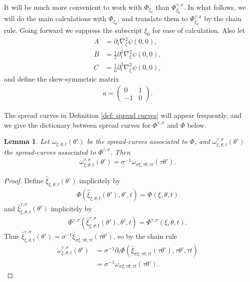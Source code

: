 \documentclass[12pt]{amsart}
\numberwithin{equation}{section}
\newtheorem{lemma}{Lemma}[section]
\newcommand{\1}{\mathbbm{1}}
\begin{document}
It will be much more convenient to work with $\Phi_{\xi_0}$ than $\Phi_{\xi_0}^{\tau, \sigma}$. In what follows, we will do the main calculations with $\Phi_{\xi_0}$, and translate them to $\Phi^{\tau, \sigma}_{\xi_0}$ by the chain rule. Going forward we suppress the subscript $\xi_0$ for ease of calculation. Also let 
\begin{align}
    A &= \partial_t \nabla_\xi^2 \psi(0,0), \\
    B &= \tfrac{1}{2} \partial_t^2 \nabla_\xi^2 \psi(0,0), \\
    C &= \tfrac{1}{6} \partial_t^3 \nabla_\xi^2 \psi(0,0),
\end{align}
and define the skew-symmetric matrix 
\begin{align}
    a = 
    \begin{pmatrix}
        0 & 1 \\
        -1 & 0
    \end{pmatrix}.
\end{align}

The spread curves in Definition \ref{def: spread curves} will appear frequently, and we give the dictionary between spread curves for $\Phi^{\tau, \sigma}$ and $\Phi$ below. 
\begin{lemma}\label{lem: spread curve dictionary}
    Let $\omega_{\xi, \theta, t}(\theta')$ be the spread-curves associated to $\Phi$, and $\omega_{\xi, \theta, t}^{\tau, \sigma}(\theta')$ the spread-curves associated to $\Phi^{\tau, \sigma}$. Then 
    \begin{align}\label{eq: spread curve dictionary}
        \omega_{\xi, \theta, t}^{\tau, \sigma}(\theta') = \sigma^{-1} \omega_{\sigma \xi, \tau \theta, \tau t}(\tau \theta').
    \end{align}
\end{lemma}

\begin{proof}
    Define $\hat \xi_{\xi, \theta, t}(\theta')$ implicitely by 
    \begin{align}\label{eq: hat xi implicit}
        \Phi(\hat \xi_{\xi, \theta, t}(\theta'), \theta', t) = \Phi(\xi, \theta, t)
    \end{align}
    and $\hat \xi_{\xi, \theta, t}^{\tau, \sigma}(\theta')$ implicitely by 
    \begin{align}
        \Phi^{\tau, \sigma}(\hat \xi_{\xi, \theta, t}^{\tau, \sigma}(\theta'), \theta', t) = \Phi^{\tau, \sigma}(\xi, \theta, t). 
    \end{align}
    Thus $\hat \xi_{\xi,\theta, t}^{\tau, \sigma}(\theta') = \sigma^{-1} \hat \xi_{\sigma \xi, \tau \theta, \tau t}(\tau \theta')$, so by the chain rule
    \begin{align}
        \omega_{\xi, \theta, t}^{\tau, \sigma}(\theta') &= \sigma^{-1} \partial_t \Phi(\hat \xi_{\sigma \xi, \tau \theta, \tau t}(\tau \theta'), \tau \theta', \tau t) \\
        &= \sigma^{-1} \omega_{\sigma \xi, \tau \theta, \tau t}(\tau \theta'). 
    \end{align}
\end{proof}
\end{document}
